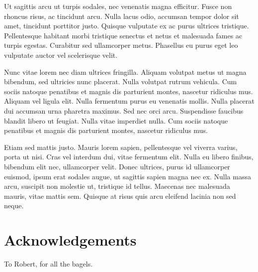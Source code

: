 \documentclass{acmsiggraph}
\begin{document}
Ut sagittis arcu ut turpis sodales, nec venenatis magna efficitur. Fusce non rhoncus risus, ac tincidunt arcu. Nulla lacus odio, accumsan tempor dolor sit amet, tincidunt porttitor justo. Quisque vulputate ex ac purus ultrices tristique. Pellentesque habitant morbi tristique senectus et netus et malesuada fames ac turpis egestas. Curabitur sed ullamcorper metus. Phasellus eu purus eget leo vulputate auctor vel scelerisque velit.

Nunc vitae lorem nec diam ultrices fringilla. Aliquam volutpat metus ut magna bibendum, sed ultricies nunc placerat. Nulla volutpat rutrum vehicula. Cum sociis natoque penatibus et magnis dis parturient montes, nascetur ridiculus mus. Aliquam vel ligula elit. Nulla fermentum purus eu venenatis mollis. Nulla placerat dui accumsan urna pharetra maximus. Sed nec orci arcu. Suspendisse faucibus blandit libero ut feugiat. Nulla vitae imperdiet nulla. Cum sociis natoque penatibus et magnis dis parturient montes, nascetur ridiculus mus.

Etiam sed mattis justo. Mauris lorem sapien, pellentesque vel viverra varius, porta ut nisi. Cras vel interdum dui, vitae fermentum elit. Nulla eu libero finibus, bibendum elit nec, ullamcorper velit. Donec ultrices, purus id ullamcorper euismod, ipsum erat sodales augue, ut sagittis sapien magna nec ex. Nulla massa arcu, suscipit non molestie ut, tristique id tellus. Maecenas nec malesuada mauris, vitae mattis sem. Quisque at risus quis arcu eleifend lacinia non sed neque.

\section*{Acknowledgements}

To Robert, for all the bagels.


\nocite{*}

\end{document}
